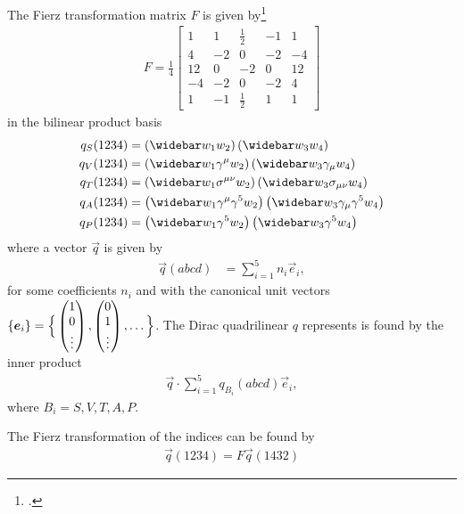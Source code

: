 \documentclass[english,notitlepage]{article}
\begin{document}
    The Fierz transformation matrix \(F\) is given by\footcite{Nieves:2003in}
    \begin{align}
        F = \frac{1}{4}
        \begin{bmatrix}
            1  & 1  & \frac{1}{2}  & -1 & 1  \\
            4  & -2 & 0    & -2 & -4 \\
            12 & 0    & -2 & 0    & 12 \\
            -4 & -2 & 0    & -2 & 4  \\
            1  & -1 & \frac{1}{2}  & 1  & 1
        \end{bmatrix}
    \end{align}
    in the bilinear product basis
    \begin{subequations}
        \begin{align}
            q_S(1234) &= \pclosed{\wbar{w}_1 w_2} \pclosed{\wbar{w}_3 w_4} \\
            q_V(1234) &= \pclosed{\wbar{w}_1 \gamma^\mu w_2} \pclosed{\wbar{w}_3 \gamma_\mu w_4} \\
            q_T(1234) &= \pclosed{\wbar{w}_1 \sigma^{\mu\nu} w_2} \pclosed{\wbar{w}_3 \sigma_{\mu\nu} w_4} \\
            q_A(1234) &= \pclosed{\wbar{w}_1 \gamma^\mu \gamma^5 w_2} \pclosed{\wbar{w}_3 \gamma_\mu \gamma^5 w_4} \\
            q_P(1234) &= \pclosed{\wbar{w}_1 \gamma^5 w_2} \pclosed{\wbar{w}_3 \gamma^5 w_4} \\
        \end{align}
    \end{subequations}
    where a vector \(\vec{q}\) is given by
    \begin{align}
        \vec{q}(abcd) &= \sum_{i=1}^5 n_i \vec{e}_i,
    \end{align}
    for some coefficients \(n_i\) and with the canonical unit vectors \(\left\{\boldsymbol{e}_i\right\} = \Big\{\begin{pmatrix} 1\\0\\\vdots \end{pmatrix}, \begin{pmatrix} 0\\1\\\vdots \end{pmatrix}, \ldots \Big\}\).
    The Dirac quadrilinear \(q\) represents is found by the inner product
    \begin{align}
        \vec{q} \cdot \sum_{i=1}^5 q_{B_i}(abcd) \vec{e}_i,
    \end{align}
    where \(B_i = S, V, T, A, P\).

    The Fierz transformation of the indices can be found by
    \begin{align}
        \vec{q}(1234) = F \vec{q}(1432)
    \end{align}
\end{document}
